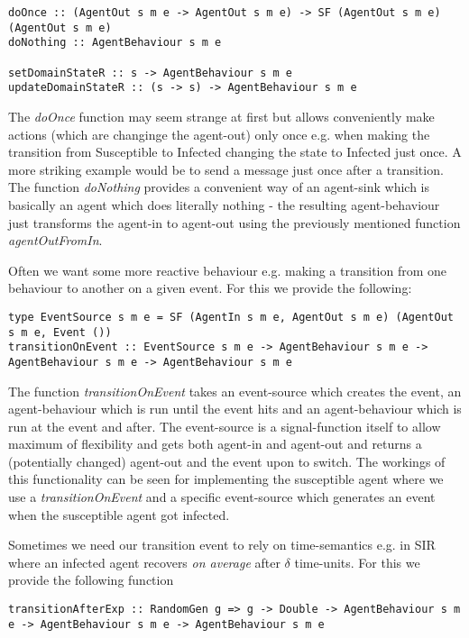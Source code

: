 \begin{verbatim}
doOnce :: (AgentOut s m e -> AgentOut s m e) -> SF (AgentOut s m e) (AgentOut s m e)
doNothing :: AgentBehaviour s m e

setDomainStateR :: s -> AgentBehaviour s m e
updateDomainStateR :: (s -> s) -> AgentBehaviour s m e
\end{verbatim}

The \textit{doOnce} function may seem strange at first but allows conveniently make actions (which are changinge the agent-out) only once e.g. when making the transition from Susceptible to Infected changing the state to Infected just once. A more striking example would be to send a message just once after a transition. The function \textit{doNothing} provides a convenient way of an agent-sink which is basically an agent which does literally nothing - the resulting agent-behaviour just transforms the agent-in to agent-out using the previously mentioned function \textit{agentOutFromIn}.

Often we want some more reactive behaviour e.g. making a transition from one behaviour to another on a given event. For this we provide the following:

\begin{verbatim}
type EventSource s m e = SF (AgentIn s m e, AgentOut s m e) (AgentOut s m e, Event ())
transitionOnEvent :: EventSource s m e -> AgentBehaviour s m e -> AgentBehaviour s m e -> AgentBehaviour s m e
\end{verbatim}

The function \textit{transitionOnEvent} takes an event-source which creates the event, an agent-behaviour which is run until the event hits and an agent-behaviour which is run at the event and after. The event-source is a signal-function itself to allow maximum of flexibility and gets both agent-in and agent-out and returns a (potentially changed) agent-out and the event upon to switch. 
The workings of this functionality can be seen for implementing the susceptible agent where we use a \textit{transitionOnEvent} and a specific event-source which generates an event when the susceptible agent got infected.

Sometimes we need our transition event to rely on time-semantics e.g. in SIR where an infected agent recovers \textit{on average} after $\delta$ time-units. For this we provide the following function

\begin{verbatim}
transitionAfterExp :: RandomGen g => g -> Double -> AgentBehaviour s m e -> AgentBehaviour s m e -> AgentBehaviour s m e
\end{verbatim}

